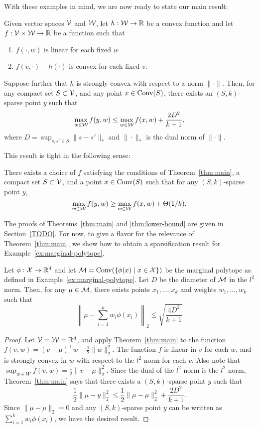 \documentclass[paper.tex]{subfiles}
\begin{document}
With these examples in mind, we are now ready to state our main result:
\begin{theorem}
\label{thm:main}
Given vector spaces $\mathcal{V}$ and $\mathcal{W}$, let $h : \mathcal{W} \to \mathbb{R}$ be a convex function and let $f : \mathcal{V} \times \mathcal{W} \to \mathbb R$ be a function 
such that
\begin{enumerate}
\item $f(\cdot,w)$ is linear for each fixed $w$
\item $f(v, \cdot) - h(\cdot)$ is convex for each fixed $v$.
\end{enumerate}
Suppose further that $h$ is strongly convex with respect to a norm $\|\cdot\|$. 
Then, for any compact set $S \subset \mathcal{V}$, and any point $x \in \operatorname{Conv}(S)$, 
there exists an $(S,k)$-sparse point $y$ such that 
\[ \max_{w \in \mathcal{W}} f(y,w) \leq \max_{w \in \mathcal{W}} f(x,w) + \frac{2D^2}{k+1}, \]
where $D = \sup_{s, s' \in S} \|s-s'\|_*$ and $\|\cdot\|_*$ is the dual norm 
of $\|\cdot\|$.
\end{theorem}
This result is tight in the following sense:
\begin{theorem}
\label{thm:lower-bound}
There exists a choice of $f$ satisfying the conditions of Theorem~\ref{thm:main}, 
a compact set $S \subset \mathcal{V}$, and a point $x \in \operatorname{Conv}(S)$ such that for any 
$(S,k)$-sparse point $y$, 
\[ \max_{w \in \mathcal{W}} f(y,w) \ge \max_{w \in \mathcal{W}} f(x,w) + \Theta(1/k). \]
\end{theorem}
The proofs of Theorems~\ref{thm:main} and \ref{thm:lower-bound} are given in Section~\ref{TODO}. For now, 
to give a flavor for the relevance of Theorem~\ref{thm:main}, we show how 
to obtain a sparsification result for Example~\ref{ex:marginal-polytope}.
\begin{proposition}
\label{prop:pseudosamples}
Let $\phi : \mathcal{X} \to \mathbb R^d$ and let $\mathcal{M} = \operatorname{Conv}(\{\phi(x) \mid x \in \mathcal{X}\})$ 
be the marginal polytope as defined in Example~\ref{ex:marginal-polytope}. 
Let $D$ be the diameter of $\mathcal{M}$ in the $l^2$ norm. Then, for any 
$\mu \in \mathcal{M}$, there exists points $x_1,\ldots,x_k$ and weights 
$w_1,\ldots,w_k$ such that
\[ \left\|\mu - \sum_{i=1}^k w_i \phi(x_i)\right\|_2 \leq \sqrt{\frac{4D^2}{k+1}} \]
\end{proposition}
\begin{proof}
Let $\mathcal{V} = \mathcal{W} = \mathbb R^d$, and apply Theorem~\ref{thm:main} to the function 
$f(v,w) = (v-\mu)^{\top}w - \frac{1}{2}\|w\|_2^2$. The function $f$ is 
linear in $v$ for each $w$, and is strongly convex in $w$ with respect to the 
$l^2$ norm for each $v$. Also note that 
$\sup_{w \in W} f(v,w) = \frac{1}{2}\|v-\mu\|_2^2$. Since the dual of the 
$l^2$ norm is the $l^2$ norm, Theorem~\ref{thm:main} says that there exists 
a $(S,k)$-sparse point $y$ such that
\[ \frac{1}{2}\|\mu - y\|_2^2 \leq \frac{1}{2}\|\mu - \mu\|_2^2 + \frac{2D^2}{k+1}. \]
Since $\|\mu-\mu\|_2 = 0$ and any $(S,k)$-sparse point $y$ can be written 
as $\sum_{i=1}^k w_i \phi(x_i)$, we have the desired result.
\end{proof}
\end{document}
